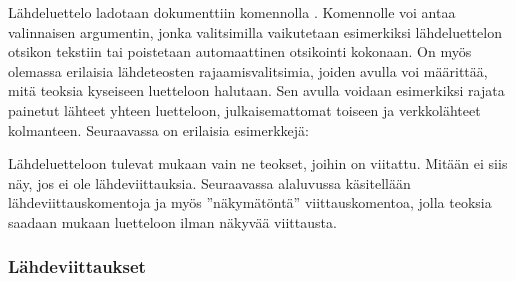 \begin{koodilohkosis}



\end{koodilohkosis}

\noindent
Lähdeluettelo ladotaan dokumenttiin komennolla
. Komennolle voi antaa valinnaisen
argumentin, jonka valitsimilla vaikutetaan esimerkiksi lähdeluettelon
otsikon tekstiin tai poistetaan automaattinen otsikointi kokonaan. On
myös olemassa erilaisia lähdeteosten rajaamisvalitsimia, joiden avulla
voi määrittää, mitä teoksia kyseiseen luetteloon halutaan. Sen avulla
voidaan esimerkiksi rajata painetut lähteet yhteen luetteloon,
julkaisemattomat toiseen ja verkkolähteet kolmanteen. Seuraavassa on
erilaisia esimerkkejä:

\begin{koodilohkosis}
\printbibliography
\printbibliography[title={Lähteet}]
\printbibliography[heading=none,  %
  type=online]           %
\end{koodilohkosis}

\noindent
Lähdeluetteloon tulevat mukaan vain ne teokset, joihin on viitattu.
Mitään ei siis näy, jos ei ole lähdeviittauksia. Seuraavassa alaluvussa
käsitellään lähdeviittauskomentoja ja myös ''näkymätöntä''
viittauskomentoa, jolla teoksia saadaan mukaan luetteloon ilman näkyvää
viittausta.

\subsubsection{Lähdeviittaukset}



